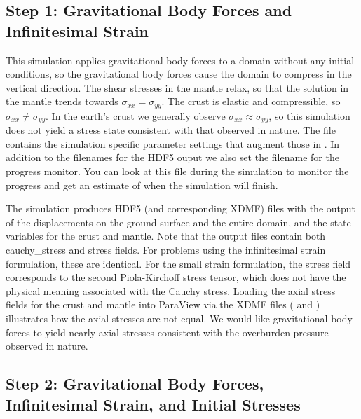 \subsection{Step 1: Gravitational Body Forces and Infinitesimal Strain}

This simulation applies gravitational body forces to a domain without
any initial conditions, so the gravitational body forces cause the
domain to compress in the vertical direction. The shear stresses in
the mantle relax, so that the solution in the mantle trends towards
$\sigma_{xx}=\sigma_{yy}$. The crust is elastic and compressible, so
$\sigma_{xx}\neq\sigma_{\mathit{yy}}$. In the earth's crust we
generally observe $\sigma_{\mathit{xx}}\approx\sigma_{\mathit{yy}}$,
so this simulation does not yield a stress state consistent with that
observed in nature. The file 
contains the simulation specific parameter settings that augment those
in .  In addition to the filenames for the
HDF5 ouput we also set the filename for the progress monitor. You can
look at this file during the simulation to monitor the progress and
get an estimate of when the simulation will finish.

The simulation produces HDF5 (and corresponding XDMF) files with the
output of the displacements on the ground surface and the entire
domain, and the state variables for the crust and mantle. Note that
the output files contain both cauchy\_stress and stress fields. For
problems using the infinitesimal strain formulation, these are
identical. For the small strain formulation, the stress field
corresponds to the second Piola-Kirchoff stress tensor, which does not
have the physical meaning associated with the Cauchy stress. Loading
the axial stress fields for the crust and mantle into ParaView via the
XDMF files ( and
) illustrates how the
axial stresses are not equal. We would like gravitational body forces
to yield nearly axial stresses consistent with the overburden pressure
observed in nature.


\subsection{Step 2: Gravitational Body Forces, Infinitesimal Strain, and Initial Stresses}

